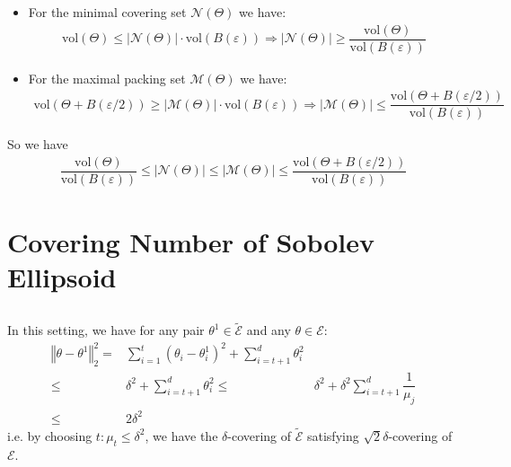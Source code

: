 \documentclass[11pt,a4paper]{ctexart}
\numberwithin{equation}{section}%
\begin{document}
\begin{itemize}[topsep=2pt,itemsep=0pt]
    \item For the minimal covering set $ \mathcal{N}(\Theta ) $ we have:
    \begin{align*}
        \mathrm{ vol }(\Theta )\leq \left\vert \mathcal{N}(\Theta ) \right\vert \cdot \mathrm{ vol }(B(\varepsilon ))  \Rightarrow \left\vert \mathcal{N}(\Theta ) \right\vert \geq \dfrac{ \mathrm{ vol }(\Theta ) }{ \mathrm{ vol }(B(\varepsilon )) }  
    \end{align*}
    \item For the maximal packing set $ \mathcal{M}(\Theta ) $ we have:
    \begin{align*}
        \mathrm{ vol }(\Theta + B(\varepsilon /2)) \geq \left\vert \mathcal{M}(\Theta ) \right\vert \cdot \mathrm{ vol }(B(\varepsilon ))  \Rightarrow \left\vert \mathcal{M}(\Theta ) \right\vert \leq \dfrac{ \mathrm{ vol }(\Theta + B(\varepsilon /2)) }{ \mathrm{ vol }(B(\varepsilon )) }  
    \end{align*}

\end{itemize}

So we have
\begin{align*}
    \dfrac{ \mathrm{ vol }(\Theta ) }{ \mathrm{ vol }(B(\varepsilon )) }  \leq \left\vert \mathcal{N}(\Theta ) \right\vert \leq \left\vert \mathcal{M}(\Theta ) \right\vert \leq \dfrac{ \mathrm{ vol }(\Theta + B(\varepsilon /2)) }{ \mathrm{ vol }(B(\varepsilon )) } 
\end{align*}


\section{Covering Number of Sobolev Ellipsoid}


    
\subsection{}

In this setting, we have for any pair $ \theta ^1 \in\tilde{\mathcal{E}} $ and any $ \theta \in \mathcal{E} $:
\begin{align*}
    \left\Vert \theta -\theta ^1 \right\Vert _2^2=& \sum_{i=1}^ t  (\theta _i-\theta _i^1)^2 + \sum_{i=t+1}^d  \theta _i^2 \\
    \leq& \delta ^2 + \sum_{i=t+1}^d  \theta _i^2
    \leq& \delta ^2 + \delta ^2\sum_{i=t+1}^d  \dfrac{ 1 }{ \mu _j }\\
    \leq& 2\delta ^2
\end{align*}
i.e. by choosing $ t: \mu _t\leq \delta ^2 $, we have the $ \delta  $-covering of $ \tilde{\mathcal{E}} $ satisfying $ \sqrt{2}\delta  $-covering of $ \mathcal{E} $.
\end{document}
